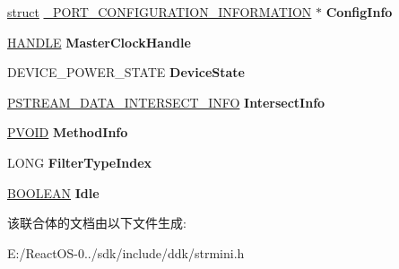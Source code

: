 \begin{DoxyCompactItemize}
\hyperlink{interfacestruct}{struct} \hyperlink{struct___p_o_r_t___c_o_n_f_i_g_u_r_a_t_i_o_n___i_n_f_o_r_m_a_t_i_o_n}{\+\_\+\+P\+O\+R\+T\+\_\+\+C\+O\+N\+F\+I\+G\+U\+R\+A\+T\+I\+O\+N\+\_\+\+I\+N\+F\+O\+R\+M\+A\+T\+I\+ON} $\ast$ {\bfseries Config\+Info}
\item 
\mbox{\label{union___h_w___s_t_r_e_a_m___r_e_q_u_e_s_t___b_l_o_c_k_1_1___command_data_a05d75cbd74307923070a8044afd99aac}} 
\hyperlink{interfacevoid}{H\+A\+N\+D\+LE} {\bfseries Master\+Clock\+Handle}
\item 
\mbox{\label{union___h_w___s_t_r_e_a_m___r_e_q_u_e_s_t___b_l_o_c_k_1_1___command_data_a00e0727c641863c6b9cffdf8f3f9ee30}} 
D\+E\+V\+I\+C\+E\+\_\+\+P\+O\+W\+E\+R\+\_\+\+S\+T\+A\+TE {\bfseries Device\+State}
\item 
\mbox{\label{union___h_w___s_t_r_e_a_m___r_e_q_u_e_s_t___b_l_o_c_k_1_1___command_data_a71c4d93be0ce5d9d421cf6f35a294fd1}} 
\hyperlink{struct___s_t_r_e_a_m___d_a_t_a___i_n_t_e_r_s_e_c_t___i_n_f_o}{P\+S\+T\+R\+E\+A\+M\+\_\+\+D\+A\+T\+A\+\_\+\+I\+N\+T\+E\+R\+S\+E\+C\+T\+\_\+\+I\+N\+FO} {\bfseries Intersect\+Info}
\item 
\mbox{\label{union___h_w___s_t_r_e_a_m___r_e_q_u_e_s_t___b_l_o_c_k_1_1___command_data_a67f801eca765aba7711eaae16154edff}} 
\hyperlink{interfacevoid}{P\+V\+O\+ID} {\bfseries Method\+Info}
\item 
\mbox{\label{union___h_w___s_t_r_e_a_m___r_e_q_u_e_s_t___b_l_o_c_k_1_1___command_data_a50f585bdc9b161cd1b9b04fa2aaf6b60}} 
L\+O\+NG {\bfseries Filter\+Type\+Index}
\item 
\mbox{\label{union___h_w___s_t_r_e_a_m___r_e_q_u_e_s_t___b_l_o_c_k_1_1___command_data_a1cfd7123088c8ad339668b35e7da8263}} 
\hyperlink{_processor_bind_8h_a112e3146cb38b6ee95e64d85842e380a}{B\+O\+O\+L\+E\+AN} {\bfseries Idle}
\end{DoxyCompactItemize}


该联合体的文档由以下文件生成\+:\begin{DoxyCompactItemize}
\item 
E\+:/\+React\+O\+S-\/0../sdk/include/ddk/strmini.\+h\end{DoxyCompactItemize}
